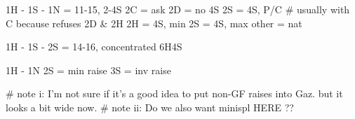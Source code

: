 1H - 1S - 1N = 11-15, 2-4S
    2C = ask
        2D = no 4S
            2S = 4S, P/C  # usually with C because refuses 2D & 2H
        2H = 4S, min
        2S = 4S, max
    other = nat

1H - 1S - 2S = 14-16, concentrated 6H4S

1H - 1N
    2S = min raise
    3S = inv raise
    
# note i: I'm not sure if it's a good idea to put non-GF raises into Gaz. but it looks a bit wide now.
# note ii: Do we also want minispl HERE ?? 
